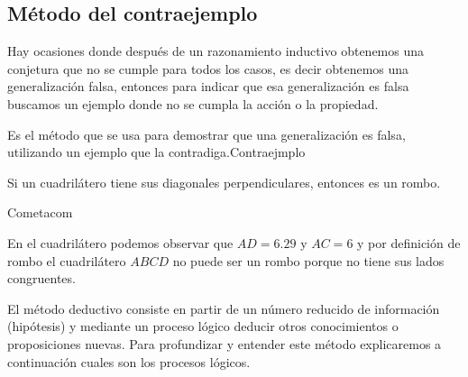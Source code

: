 \subsection{M\'etodo del contraejemplo}
Hay ocasiones donde despu\'es de un razonamiento inductivo obtenemos una
conjetura que no se cumple para todos los casos, es decir obtenemos una
generalizaci\'on falsa, entonces para indicar que esa generalizaci\'on es falsa
buscamos un ejemplo donde no se cumpla la acci\'on o la propiedad.
\begin{ideas}{Es el m\'etodo que se usa para demostrar que una
generalizaci\'on es falsa, utilizando un ejemplo que la
contradiga.}{Contraejmplo}
\end{ideas}
\begin{ejemplo}{Si un cuadril\'atero tiene sus diagonales perpendiculares,
entonces es un rombo.}
\begin{figura}{
}{Cometa}{com}
 \end{figura}
En el cuadril\'atero podemos observar que $AD=6.29$ y $AC=6$ y por definici\'on
de rombo el cuadril\'atero $ABCD$ no puede ser un rombo porque no tiene sus
lados congruentes.
\end{ejemplo}
El método deductivo consiste en partir de un número reducido de información
(hipótesis) y mediante un proceso lógico deducir otros conocimientos o
proposiciones nuevas.
Para profundizar y entender este método explicaremos a continuación cuales son
los procesos lógicos.

